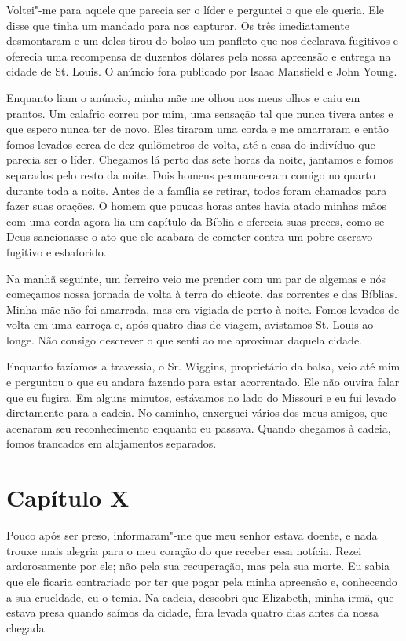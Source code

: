Voltei"-me para aquele que parecia ser o líder e perguntei o que ele
queria. Ele disse que tinha um mandado para nos capturar. Os três
imediatamente desmontaram e um deles tirou do bolso um panfleto que nos
declarava fugitivos e oferecia uma recompensa de duzentos dólares pela
nossa apreensão e entrega na cidade de St. Louis. O anúncio fora
publicado por Isaac Mansfield e John Young.

Enquanto liam o anúncio, minha mãe me olhou nos meus olhos e caiu em
prantos. Um calafrio correu por mim, uma sensação tal que nunca tivera
antes e que espero nunca ter de novo. Eles tiraram uma corda e me
amarraram e então fomos levados cerca de dez quilômetros de volta, até a
casa do indivíduo que parecia ser o líder. Chegamos lá perto das sete
horas da noite, jantamos e fomos separados pelo resto da noite. Dois
homens permaneceram comigo no quarto durante toda a noite. Antes de a
família se retirar, todos foram chamados para fazer suas orações. O
homem que poucas horas antes havia atado minhas mãos com uma corda agora
lia um capítulo da Bíblia e oferecia suas preces, como se Deus
sancionasse o ato que ele acabara de cometer contra um pobre escravo
fugitivo e esbaforido.

Na manhã seguinte, um ferreiro veio me prender com um par de algemas e
nós começamos nossa jornada de volta à terra do chicote, das correntes e
das Bíblias. Minha mãe não foi amarrada, mas era vigiada de perto à
noite. Fomos levados de volta em uma carroça e, após quatro dias de
viagem, avistamos St. Louis ao longe. Não consigo descrever o que senti
ao me aproximar daquela cidade.

Enquanto fazíamos a travessia, o Sr. Wiggins, proprietário da balsa,
veio até mim e perguntou o que eu andara fazendo para estar acorrentado.
Ele não ouvira falar que eu fugira. Em alguns minutos, estávamos no lado
do Missouri e eu fui levado diretamente para a cadeia. No caminho,
enxerguei vários dos meus amigos, que acenaram seu reconhecimento
enquanto eu passava. Quando chegamos à cadeia, fomos trancados em
alojamentos separados.

\chapter{Capítulo X}

Pouco após ser preso, informaram"-me que meu senhor estava doente, e nada
trouxe mais alegria para o meu coração do que receber essa notícia.
Rezei ardorosamente por ele; não pela sua recuperação, mas pela sua
morte. Eu sabia que ele ficaria contrariado por ter que pagar pela minha
apreensão e, conhecendo a sua crueldade, eu o temia. Na cadeia, descobri
que Elizabeth, minha irmã, que estava presa quando saímos da cidade,
fora levada quatro dias antes da nossa chegada.

